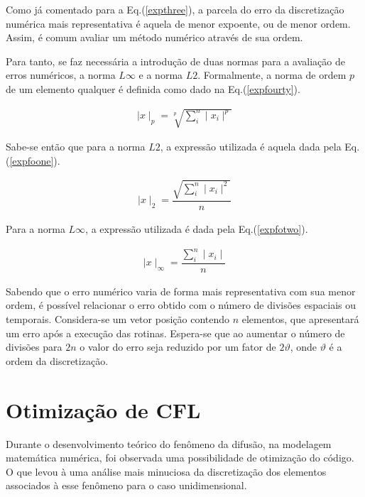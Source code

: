 \noindent

	Como já comentado para a Eq.(\ref{expthree}), a parcela do erro da discretização numérica mais representativa é aquela de menor expoente, ou de menor ordem. Assim, é comum avaliar um método numérico através de sua ordem.
	
	Para tanto, se faz necessária a introdução de duas normas para a avaliação de erros numéricos, a norma $L\infty$ e a norma $L2$. Formalmente, a norma de ordem $p$ de um elemento qualquer é definida como dado na Eq.(\ref{expfourty}).
	
\begin{align}
\label{expfourty}
\mid x \mid _{p} = \sqrt[p]{\sum_{i}^{n}\mid x_{i}\mid ^p}
\end{align}

	Sabe-se então que para a norma $L2$, a expressão utilizada é aquela dada pela Eq.(\ref{expfoone}).

\begin{align}
\label{expfoone}
\mid x \mid _{2} = \dfrac{\sqrt{\sum_{i}^{n}\mid x_{i}\mid ^2}}{n}
\end{align}

	Para a norma $L\infty$, a expressão utilizada é dada pela Eq.(\ref{expfotwo}).

\begin{align}
\label{expfotwo}
\mid x \mid_{\infty} = \dfrac{\sum_{i}^{n}\mid x_{i}\mid}{n}
\end{align}

\newpage

	Sabendo que o erro numérico varia de forma mais representativa com sua menor ordem, é possível relacionar o erro obtido com o número de divisões espaciais ou temporais. Considera-se um vetor posição contendo $n$ elementos, que apresentará um erro após a execução das rotinas. Espera-se que ao aumentar o número de divisões para $2n$ o valor do erro seja reduzido por um fator de $2\vartheta$, onde $\vartheta$ é a ordem da discretização.


\section{Otimização de CFL}
\noindent

	Durante o desenvolvimento teórico do fenômeno da difusão, na modelagem matemática numérica, foi observada uma possibilidade de otimização do código. O que levou à uma análise mais minuciosa da discretização dos elementos associados à esse fenômeno para o caso unidimensional.
	
